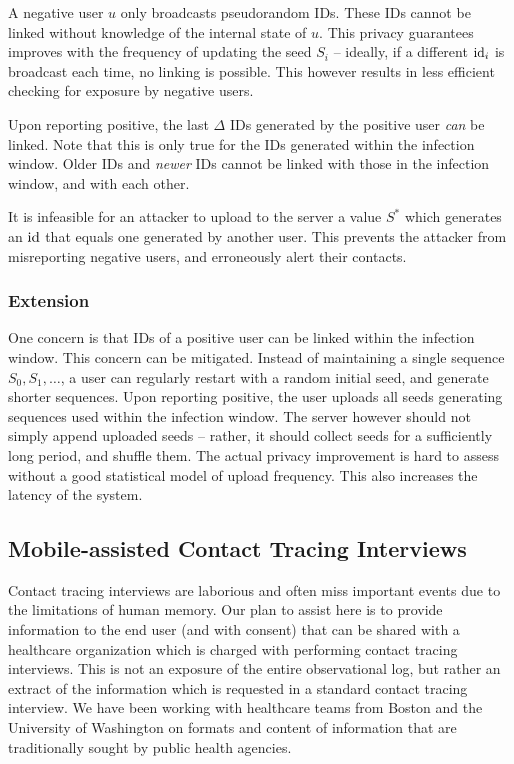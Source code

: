 \documentclass{article}
\begin{document}
  A negative user $u$ only broadcasts pseudorandom IDs. These IDs cannot be linked without knowledge of the internal state of $u$. This privacy guarantees improves with the frequency of updating the seed $S_i$ -- ideally, if a different $\mathrm{id}_i$ is broadcast each time, no linking is possible. This however results in less efficient checking for exposure by negative users.
\medskip

 Upon reporting positive, the last $\Delta$ IDs generated by the positive user {\em can} be linked. Note that this is only true for the IDs generated within the infection window. Older IDs and {\em newer} IDs cannot be linked with those in the infection window, and with each other.
\medskip

 It is infeasible for an attacker to upload to the server a value $S^*$ which generates an $\mathrm{id}$ that equals one generated by another user. This prevents the attacker from misreporting negative users, and erroneously alert their contacts.  

\subsubsection{Extension}

One concern is that IDs of a positive user can be linked within the infection window. This concern can be mitigated. Instead of maintaining a single sequence $S_0, S_1, \ldots$, a user can regularly restart with a random initial seed, and generate  shorter sequences. Upon reporting positive, the user uploads all seeds generating sequences used within the infection window. The server however should not simply append uploaded seeds -- rather, it should collect seeds for a sufficiently long period, and shuffle them. The actual privacy improvement is  hard to assess without a good statistical model of upload frequency. This also increases the latency of the system.

\subsection{Mobile-assisted Contact Tracing Interviews} 
Contact tracing interviews are laborious and often miss important events due to the limitations of human memory.  Our plan to assist here is to provide information to the end user (and with consent) that can be shared with a healthcare organization which is charged with performing contact tracing interviews.   This is not an exposure of the entire observational log, but rather an extract of the information which is requested in a standard contact tracing interview. We have been working with healthcare teams from Boston and the University of Washington on formats and content of information that are traditionally sought by public health agencies.
\end{document}
